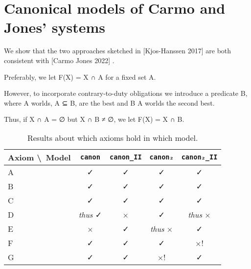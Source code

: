 \section{Canonical models of Carmo and Jones' systems}

We show that the two approaches sketched in [Kjos-Hanssen 2017] are both consistent with [Carmo Jones 2022]
\cite{MR4500520}.

Preferably, we let F(X) = X ∩ A for a fixed set A.

However, to incorporate contrary-to-duty obligations we introduce a predicate B,
where A worlds, A ⊆ B, are the best and B \setminus A worlds the second best.

Thus, if X ∩ A = ∅ but X ∩ B ≠ ∅, we let F(X) = X ∩ B.



\begin{table}[h]
    \centering
    \begin{tabular}{lcccc}
        \toprule
        Axiom \textbackslash\ Model & \texttt{canon} & \texttt{canon\_II} & \texttt{canon₂} & \texttt{canon₂\_II} \\
        \midrule
        A & ✓ & ✓ & ✓ & ✓ \\
        B & ✓ & ✓ & ✓ & ✓ \\
        C & ✓ & ✓ & ✓ & ✓ \\
        D & \textit{thus} ✓ & × & ✓ & \textit{thus} × \\
        E & × & ✓ & \textit{thus} × & ✓ \\
        F & ✓ & ✓ & ✓ & ×! \\
        G & ✓ & ✓ & ×! & ✓ \\
        \bottomrule
    \end{tabular}
    \caption{Results about which axioms hold in which model.}
    \label{tab:example}
\end{table}



